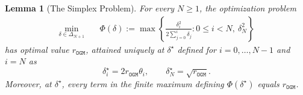 \documentclass[11pt]{article}
\newtheorem{lemma}[thm]{Lemma}
\begin{document}
\begin{lemma}[The Simplex Problem]\label{lem:ogm-simplex-prob}
For every $N\geq1$, the optimization problem
\begin{equation*}
\begin{aligned}
\min_{\delta\in\Delta_{N+1}}\quad
&\Phi(\delta) := \max\left\{
\frac{\delta_i^2}{2\sum_{j=0}^i\delta_j}:0\leq i<N,
\ \delta_N^2
\right\}
\end{aligned}
\end{equation*}
has optimal value $r_\mathtt{OGM}$, attained uniquely at $\delta^\star$ defined for $i=0,\dots,N-1$ and $i=N$ as
\begin{equation}\label{eq:ogm-chain-increments}
    \delta_i^\star=2r_\mathtt{OGM}\theta_i,
    \qquad
    \delta_N^\star=\sqrt{r_\mathtt{OGM}}.
\end{equation}
Moreover, at $\delta^\star$, every term in the finite maximum defining $\Phi(\delta^\star)$ equals $r_\mathtt{OGM}$.
\end{lemma}
\end{document}
